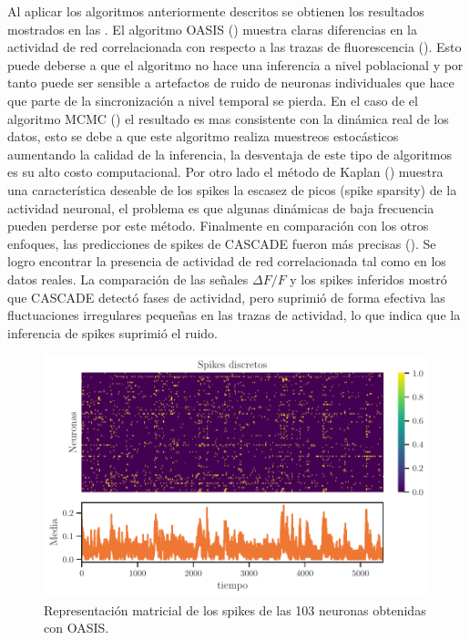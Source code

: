 Al aplicar los algoritmos anteriormente descritos se obtienen los resultados mostrados en las .   El algoritmo OASIS () muestra claras diferencias en la actividad de red correlacionada  con respecto a las  trazas de fluorescencia    (). Esto puede deberse a que el algoritmo no hace una inferencia a nivel poblacional y por tanto puede ser sensible  a artefactos de ruido de neuronas individuales que hace que parte de la sincronización a nivel temporal se pierda.  En el caso de el algoritmo MCMC ()  el resultado es mas consistente con la dinámica	 real de los datos, esto se debe a que este algoritmo  realiza muestreos estocásticos aumentando la calidad de la inferencia, la desventaja de este tipo de algoritmos es su alto costo computacional. Por otro lado el método de Kaplan () muestra una característica deseable de los spikes la  escasez de picos (spike sparsity) de la actividad neuronal, el problema es que algunas dinámicas de baja frecuencia pueden perderse por este método.   Finalmente  en comparación con los otros enfoques, las predicciones de spikes  de CASCADE fueron más precisas (). Se logro encontrar la presencia de actividad de red correlacionada tal como en los datos reales.   La comparación de las señales $\Delta F/F$ y  los spikes inferidos mostró que CASCADE detectó fases de actividad, pero suprimió de forma efectiva las fluctuaciones irregulares pequeñas en las trazas de actividad, lo que indica que la inferencia de spikes suprimió el ruido. 

 \begin{figure}[h!]
	\centering{}\includegraphics[width=\imsize]{oasis_spike.pdf}
	\caption[Representación  matricial de los spikes de las 103 neuronas obtenidas con OASIS. ]{Representación  matricial de los spikes de las 103 neuronas obtenidas con OASIS.}\label{f:oasis_spike}  
\end{figure}

